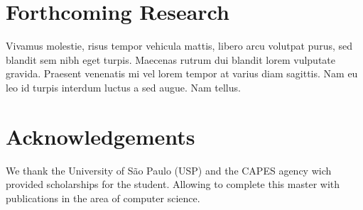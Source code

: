 \documentclass[40pt, a0, portrait]{a0poster}
\begin{document}
\begin{multicols}{2}

\section*{Forthcoming Research}

Vivamus molestie, risus tempor vehicula mattis, libero arcu volutpat purus, sed blandit sem nibh eget turpis. Maecenas rutrum dui blandit lorem vulputate gravida. Praesent venenatis mi vel lorem tempor at varius diam sagittis. Nam eu leo id turpis interdum luctus a sed augue. Nam tellus.


\nocite{*} %


\section*{Acknowledgements}

We thank the University of São Paulo (USP) and the CAPES agency wich provided scholarships for the student. Allowing to complete this master with publications in the area of computer science.


\end{multicols}
\end{document}
